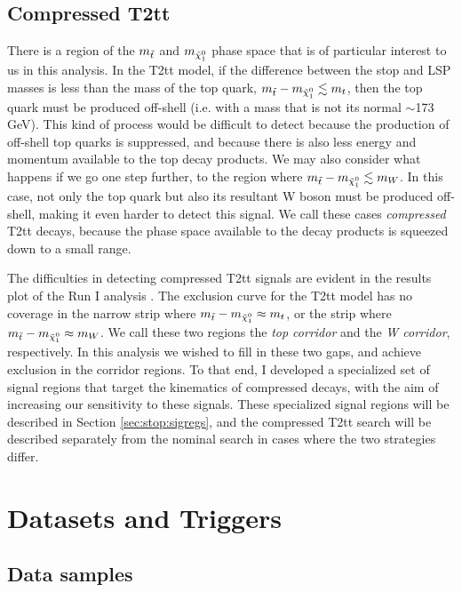 
\subsection{Compressed T2tt}
\label{ssec:stop:sigcompressed}

There is a region of the $m_{\tilde{t}}$ and $m_{\tilde{\chi}^0_1}$ phase space
that is of particular interest to us in this analysis. In the T2tt
model, if the difference between the stop and LSP masses is less than
the mass of the top quark, $m_{\tilde{t}} - m_{\tilde{\chi}^0_1} \lesssim m_t$, then the top quark
must be produced off-shell (i.e. with a mass that is not its normal
$\sim$173 GeV). This kind of process would be difficult to detect
because the production of off-shell top quarks is suppressed, and
because there is also less energy and momentum available to the top
decay products. We may also consider what happens if we go one step
further, to the region where $m_{\tilde{t}} - m_{\tilde{\chi}^0_1} \lesssim m_W$. In this case, not
only the top quark but also its resultant W boson must be produced
off-shell, making it even harder to detect this signal. We call these
cases \emph{compressed} T2tt decays, because the phase space available to
the decay products is squeezed down to a small range.

The difficulties in detecting compressed T2tt signals are evident in
the results plot of the Run I analysis \cite{stop1l8tev}. The exclusion
curve for the T2tt model has no coverage in the narrow strip where
$m_{\tilde{t}} - m_{\tilde{\chi}^0_1} \approx m_t$, or the strip where $m_{\tilde{t}} - m_{\tilde{\chi}^0_1}
\approx m_W$. We call these two regions the \emph{top corridor} and
the \emph{W corridor}, respectively. In this analysis we wished to
fill in these two gaps, and achieve exclusion in the corridor
regions. To that end, I developed a specialized set of
signal regions that target the kinematics of compressed decays, with
the aim of increasing our sensitivity to these signals. These
specialized signal regions will be described in Section
\ref{sec:stop:sigregs}, and the compressed T2tt search will be
described separately from the nominal search in cases where
the two strategies differ.

\section{Datasets and Triggers}
\label{sec:stop:datatrig}

\subsection{Data samples}
\label{ssec:stop:datasamples}

